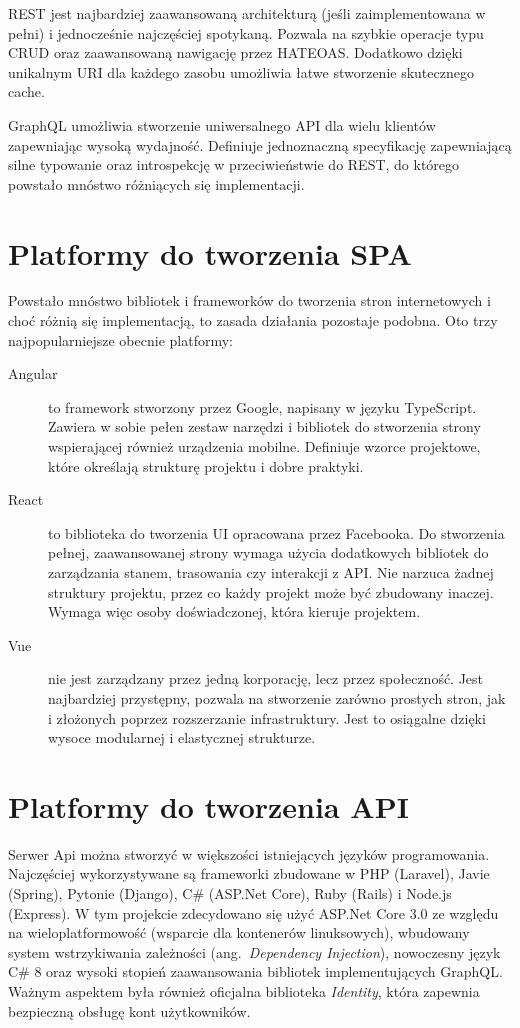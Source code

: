 		REST jest najbardziej zaawansowaną architekturą (jeśli zaimplementowana w pełni) i jednocześnie najczęściej spotykaną.
		Pozwala na szybkie operacje typu CRUD oraz zaawansowaną nawigację przez HATEOAS.
		Dodatkowo dzięki unikalnym URI dla każdego zasobu umożliwia łatwe stworzenie skutecznego cache.

		GraphQL umożliwia stworzenie uniwersalnego API dla wielu klientów zapewniając wysoką wydajność.
		Definiuje jednoznaczną specyfikację zapewniającą silne typowanie oraz introspekcję w przeciwieństwie do REST,
		do którego powstało mnóstwo różniących się implementacji.

\section{Platformy do tworzenia SPA}
	Powstało mnóstwo bibliotek i frameworków do tworzenia stron internetowych i choć różnią się implementacją, to zasada działania pozostaje podobna.
	Oto trzy najpopularniejsze obecnie platformy:
	\begin{description}
		\item[Angular] to framework stworzony przez Google, napisany w języku TypeScript.
			Zawiera w sobie pełen zestaw narzędzi i bibliotek do stworzenia strony wspierającej również urządzenia mobilne.
			Definiuje wzorce projektowe, które określają strukturę projektu i dobre praktyki.

		\item[React] to biblioteka do tworzenia UI opracowana przez Facebooka.
			Do stworzenia pełnej, zaawansowanej strony wymaga użycia dodatkowych bibliotek do zarządzania stanem, trasowania czy interakcji z API.
			Nie narzuca żadnej struktury projektu, przez co każdy projekt może być zbudowany inaczej.
			Wymaga więc osoby doświadczonej, która kieruje projektem.

		\item[Vue] nie jest zarządzany przez jedną korporację, lecz przez społeczność.
			Jest najbardziej przystępny, pozwala na stworzenie zarówno prostych stron, jak i złożonych poprzez rozszerzanie infrastruktury.
			Jest to osiągalne dzięki wysoce modularnej i elastycznej strukturze.
	\end{description}

\section{Platformy do tworzenia API}
	Serwer Api można stworzyć w większości istniejących języków programowania.
	Najczęściej wykorzystywane są frameworki zbudowane w PHP (Laravel), Javie (Spring), Pytonie (Django), C\# (ASP.Net Core), Ruby (Rails) i Node.js (Express).
	W tym projekcie zdecydowano się użyć ASP.Net Core 3.0 ze względu na wieloplatformowość (wsparcie dla kontenerów linuksowych),
	wbudowany system wstrzykiwania zależności (ang.\ \emph{Dependency Injection}), nowoczesny język C\# 8 oraz wysoki stopień zaawansowania bibliotek implementujących GraphQL.
	Ważnym aspektem była również oficjalna biblioteka \emph{Identity}, która zapewnia bezpieczną obsługę kont użytkowników.

